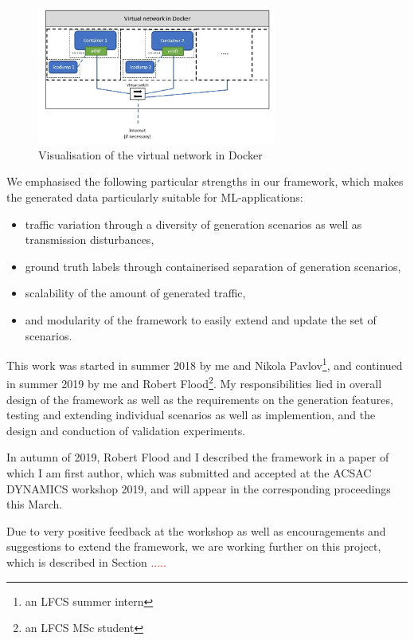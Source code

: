 \documentclass[a4paper,12pt,twoside]{report}
\begin{document}
\begin{figure}
\centering
\includegraphics[width=0.7\textwidth]{images/Dockernet.jpg}
\caption{Visualisation of the virtual network in Docker}\label{docker}
\end{figure}


We emphasised the following particular strengths in our framework, which makes the generated data particularly suitable for ML-applications:
\begin{itemize}
\item traffic variation through a diversity of generation scenarios as well as transmission disturbances,
\item ground truth labels through containerised separation of generation scenarios,
\item scalability of the amount of generated traffic,
\item and modularity of the framework to easily extend and update the set of scenarios.
\end{itemize}



This work was started in summer 2018 by me and Nikola Pavlov\footnote{an LFCS summer intern}, and continued in summer 2019 by me and Robert Flood\footnote{an LFCS MSc student}. My responsibilities lied in overall design of the framework as well as the requirements on the generation features, testing and extending individual scenarios as well as implemention, and the design and conduction of validation experiments. 

In autumn of 2019, Robert Flood and I described the framework in a paper of which I am first author, which was submitted and accepted at the ACSAC DYNAMICS workshop 2019, and will appear in the corresponding proceedings this March. 

Due to very positive feedback at the workshop as well as encouragements and suggestions to extend the framework, we are working further on this project, which is described in Section \textcolor{red}{.....}
\end{document}
